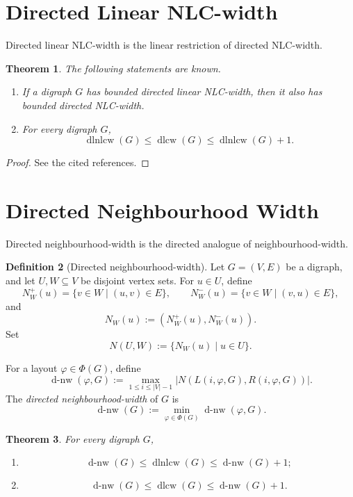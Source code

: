 \documentclass[10pt]{book}
\newtheorem{theorem}{Theorem}[section]
\theoremstyle{definition}
\newtheorem{definition}[theorem]{Definition}
\begin{document}
\section{Directed Linear NLC-width}
Directed linear NLC-width \cite{65,69} is the linear restriction of directed NLC-width.

\begin{theorem}
The following statements are known.
\begin{enumerate}
    \item If a digraph \(G\) has bounded directed linear NLC-width, then it also has bounded directed NLC-width.

    \item For every digraph \(G\),
    \[
    \operatorname{dlnlcw}(G)\leq \operatorname{dlcw}(G)\leq \operatorname{dlnlcw}(G)+1.
    \]
    \cite{69}
\end{enumerate}
\end{theorem}

\begin{proof}
See the cited references.
\end{proof}

\section{Directed Neighbourhood Width}
Directed neighbourhood-width \cite{69} is the directed analogue of neighbourhood-width.

\begin{definition}[Directed neighbourhood-width]
\cite{69}
Let \(G=(V,E)\) be a digraph, and let \(U,W\subseteq V\) be disjoint vertex sets.  
For \(u\in U\), define
\[
N_W^+(u)=\{v\in W\mid (u,v)\in E\},
\qquad
N_W^-(u)=\{v\in W\mid (v,u)\in E\},
\]
and
\[
N_W(u):=(N_W^+(u),N_W^-(u)).
\]
Set
\[
N(U,W):=\{N_W(u)\mid u\in U\}.
\]

For a layout \(\varphi\in \Phi(G)\), define
\[
\operatorname{d\mbox{-}nw}(\varphi,G):=
\max_{1\leq i\leq |V|-1}
|N(L(i,\varphi,G),R(i,\varphi,G))|.
\]
The \emph{directed neighbourhood-width} of \(G\) is
\[
\operatorname{d\mbox{-}nw}(G):=
\min_{\varphi\in \Phi(G)} \operatorname{d\mbox{-}nw}(\varphi,G).
\]
\end{definition}

\begin{theorem}
For every digraph \(G\),
\begin{enumerate}
    \item
    \[
    \operatorname{d\mbox{-}nw}(G)\leq \operatorname{dlnlcw}(G)\leq \operatorname{d\mbox{-}nw}(G)+1;
    \]
    \item
    \[
    \operatorname{d\mbox{-}nw}(G)\leq \operatorname{dlcw}(G)\leq \operatorname{d\mbox{-}nw}(G)+1.
    \]
\end{enumerate}
\cite{69}
\end{theorem}
\end{document}
